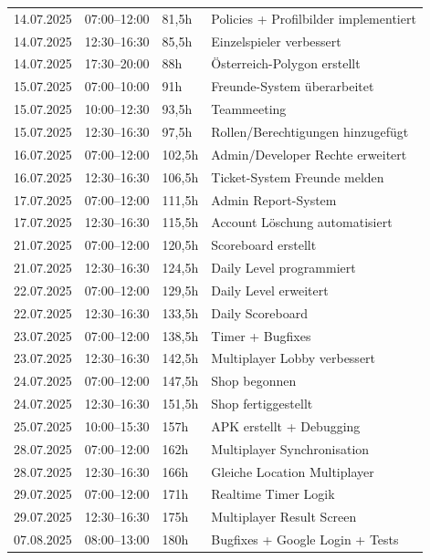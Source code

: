 \begin{longtable}{p{2.8cm} | p{2.5cm} | p{2.5cm} | p{7cm}}
14.07.2025 & 07:00–12:00 & 81,5h & Policies + Profilbilder implementiert \\
14.07.2025 & 12:30–16:30 & 85,5h & Einzelspieler verbessert \\
14.07.2025 & 17:30–20:00 & 88h & Österreich-Polygon erstellt \\
15.07.2025 & 07:00–10:00 & 91h & Freunde-System überarbeitet \\
15.07.2025 & 10:00–12:30 & 93,5h & Teammeeting \\
15.07.2025 & 12:30–16:30 & 97,5h & Rollen/Berechtigungen hinzugefügt \\
16.07.2025 & 07:00–12:00 & 102,5h & Admin/Developer Rechte erweitert \\
16.07.2025 & 12:30–16:30 & 106,5h & Ticket-System Freunde melden \\
17.07.2025 & 07:00–12:00 & 111,5h & Admin Report-System \\
17.07.2025 & 12:30–16:30 & 115,5h & Account Löschung automatisiert \\

21.07.2025 & 07:00–12:00 & 120,5h & Scoreboard erstellt \\
21.07.2025 & 12:30–16:30 & 124,5h & Daily Level programmiert \\
22.07.2025 & 07:00–12:00 & 129,5h & Daily Level erweitert \\
22.07.2025 & 12:30–16:30 & 133,5h & Daily Scoreboard \\
23.07.2025 & 07:00–12:00 & 138,5h & Timer + Bugfixes \\
23.07.2025 & 12:30–16:30 & 142,5h & Multiplayer Lobby verbessert \\
24.07.2025 & 07:00–12:00 & 147,5h & Shop begonnen \\
24.07.2025 & 12:30–16:30 & 151,5h & Shop fertiggestellt \\
25.07.2025 & 10:00–15:30 & 157h & APK erstellt + Debugging \\

28.07.2025 & 07:00–12:00 & 162h & Multiplayer Synchronisation \\
28.07.2025 & 12:30–16:30 & 166h & Gleiche Location Multiplayer \\
29.07.2025 & 07:00–12:00 & 171h & Realtime Timer Logik \\
29.07.2025 & 12:30–16:30 & 175h & Multiplayer Result Screen \\

07.08.2025 & 08:00–13:00 & 180h & Bugfixes + Google Login + Tests \\


\end{longtable}
